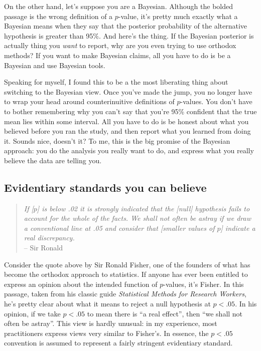 On the other hand, let's suppose you are a Bayesian. Although the bolded passage is the wrong definition of a $p$-value, it's pretty much exactly what a Bayesian means when they say that the posterior probability of the alternative hypothesis is greater than 95\%. And here's the thing. If the Bayesian posterior is actually thing you {\it want} to report, why are you even trying to use orthodox methods? If you want to make Bayesian claims, all you have to do is be a Bayesian and use Bayesian tools. 

Speaking for myself, I found this to be a the most liberating thing about switching to the Bayesian view. Once you've made the jump, you no longer have to wrap your head around counterinuitive definitions of $p$-values. You don't have to bother remembering why you can't say that you're 95\% confident that the true mean lies within some interval. All you have to do is be honest about what you believed before you ran the study, and then report what you learned from doing it. Sounds nice, doesn't it? To me, this is the big promise of the Bayesian approach: you do the analysis you really want to do, and express what you really believe the data are telling you.



\subsection{Evidentiary standards you can believe}



\begin{quote}
{\it If [$p$] is below .02 it is strongly indicated that the [null] hypothesis fails to account for the whole of the facts. We shall not often be astray if we draw a conventional line at .05 and consider that [smaller values of $p$] indicate a real discrepancy.}\\
\hspace*{2cm} -- Sir Ronald 
\end{quote}


Consider the quote above by Sir Ronald Fisher, one of the founders of what has become the orthodox approach to statistics. If anyone has ever been entitled to express an opinion about the intended function of $p$-values, it's Fisher. In this passage, taken from his classic guide {\it Statistical Methods for Research Workers}, he's pretty clear about what it means to reject a null hypothesis at $p<.05$. In his opinion, if we take $p<.05$ to mean there is ``a real effect'', then ``we shall not often be astray''. This view is hardly unusual: in my experience, most practitioners express views very similar to Fisher's. In essence, the $p<.05$ convention is assumed to represent a fairly stringent evidentiary standard.


